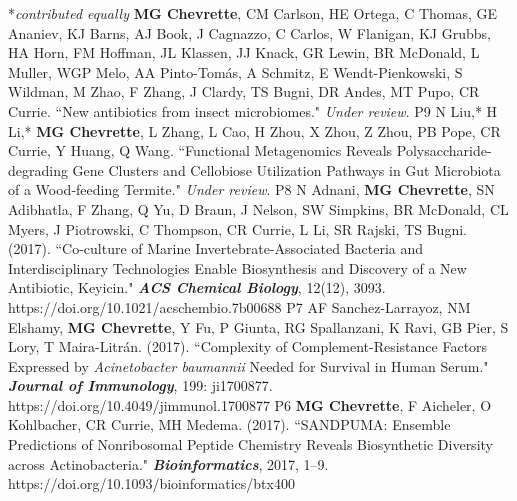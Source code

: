 
\begin{cvpubs}
  \cvpub
    {\hspace{-1cm} *\textit{contributed equally}} %
    {} %
  \cvpub
    {\textbf{MG Chevrette}, CM Carlson, HE Ortega, C Thomas, GE Ananiev, KJ Barns, AJ Book, J Cagnazzo, C Carlos, W Flanigan, KJ Grubbs, HA Horn, FM Hoffman, JL Klassen, JJ Knack, GR Lewin, BR McDonald, L Muller, WGP Melo, AA Pinto-Tom\'{a}s, A Schmitz, E Wendt-Pienkowski, S Wildman, M Zhao, F Zhang, J Clardy, TS Bugni, DR Andes, MT Pupo, CR Currie. ``New antibiotics from insect microbiomes." \textit{Under review}.
    } %
    {P9} %
  \cvpub
    {N Liu,* H Li,* \textbf{MG Chevrette}, L Zhang, L Cao, H Zhou, X Zhou, Z Zhou, PB Pope, CR Currie, Y Huang, Q Wang. ``Functional Metagenomics Reveals Polysaccharide-degrading Gene Clusters and Cellobiose Utilization Pathways in Gut Microbiota of a Wood-feeding Termite." \textit{Under review}.
    } %
    {P8} %
  \cvpub
    {N Adnani, \textbf{MG Chevrette}, SN Adibhatla, F Zhang, Q Yu, D Braun, J Nelson, SW Simpkins, BR McDonald, CL Myers, J Piotrowski, C Thompson, CR Currie, L Li, SR Rajski, TS Bugni. (2017). ``Co-culture of Marine Invertebrate-Associated Bacteria and Interdisciplinary Technologies Enable Biosynthesis and Discovery of a New Antibiotic, Keyicin." \textit{\textbf{ACS Chemical Biology}}, 12(12), 3093.  https://doi.org/10.1021/acschembio.7b00688 
    } %
    {P7} %
  \cvpub
    {AF Sanchez-Larrayoz, NM Elshamy, \textbf{MG Chevrette}, Y Fu, P Giunta, RG Spallanzani, K Ravi, GB Pier, S Lory, T Maira-Litr\'{a}n. (2017). ``Complexity of Complement-Resistance Factors Expressed by \textit{Acinetobacter baumannii} Needed for Survival in Human Serum." \textit{\textbf{Journal of Immunology}}, 199: ji1700877. https://doi.org/10.4049/jimmunol.1700877
    }%
    {P6} %
  \cvpub
    {\textbf{MG Chevrette}, F Aicheler, O Kohlbacher, CR Currie, MH Medema. (2017). ``SANDPUMA: Ensemble Predictions of Nonribosomal Peptide Chemistry Reveals Biosynthetic Diversity across Actinobacteria." \textit{\textbf{Bioinformatics}}, 2017, 1–9. https://doi.org/10.1093/bioinformatics/btx400
}
\end{cvpubs}
